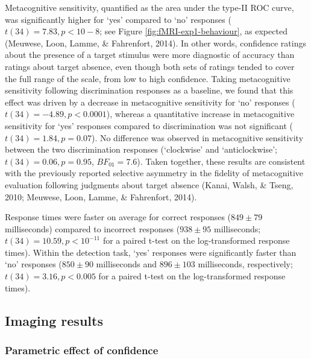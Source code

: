 \documentclass[12pt,twoside]{reedthesis}
\begin{document}
Metacognitive sensitivity, quantified as the area under the type-II ROC curve, was significantly higher for `yes' compared to `no' responses (\(t(34) = 7.83, p<10-8\); see Figure \ref{fig:fMRI-exp1-behaviour}, as expected (Meuwese, Loon, Lamme, \& Fahrenfort, 2014). In other words, confidence ratings about the presence of a target stimulus were more diagnostic of accuracy than ratings about target absence, even though both sets of ratings tended to cover the full range of the scale, from low to high confidence. Taking metacognitive sensitivity following discrimination responses as a baseline, we found that this effect was driven by a decrease in metacognitive sensitivity for `no' responses (\(t(34) = -4.89, p<0.0001\)), whereas a quantitative increase in metacognitive sensitivity for `yes' responses compared to discrimination was not significant (\(t(34)=1.84, p=0.07\)). No difference was observed in metacognitive sensitivity between the two discrimination responses (`clockwise' and `anticlockwise'; \(t(34) = 0.06, p=0.95\), \(BF_{01}=7.6\)). Taken together, these results are consistent with the previously reported selective asymmetry in the fidelity of metacognitive evaluation following judgments about target absence (Kanai, Walsh, \& Tseng, 2010; Meuwese, Loon, Lamme, \& Fahrenfort, 2014).

Response times were faster on average for correct responses (\(849 \pm 79\) milliseconds) compared to incorrect responses (\(938 \pm 95\) milliseconds; \(t(34)=10.59, p<10^{-11}\) for a paired t-test on the log-transformed response times). Within the detection task, `yes' responses were significantly faster than `no' responses (\(850 \pm 90\) milliseconds and \(896 \pm 103\) milliseconds, respectively; \(t(34)=3.16, p<0.005\) for a paired t-test on the log-transformed response times).

\hypertarget{imaging-results}{%
\subsection{Imaging results}\label{imaging-results}}

\hypertarget{parametric-effect-of-confidence}{%
\subsubsection*{Parametric effect of confidence}\label{parametric-effect-of-confidence}}
\end{document}
